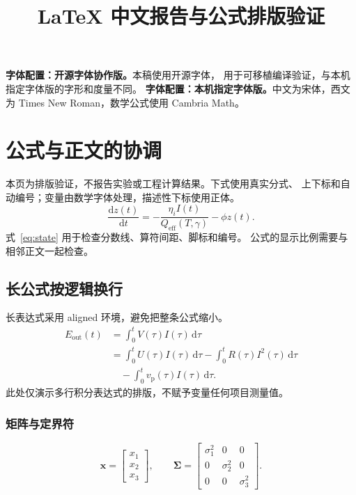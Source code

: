\documentclass[UTF8,fontset=none,zihao=5]{ctexart}
\title{\sffamily\bfseries LaTeX 中文报告与公式排版验证}
\author{}
\date{}
\begin{document}
\maketitle
\ifportablefonts
\noindent\textbf{字体配置：开源字体协作版。}本稿使用开源字体，
用于可移植编译验证，与本机指定字体版的字形和度量不同。
\else
\noindent\textbf{字体配置：本机指定字体版。}中文为宋体，西文为
Times New Roman，数学公式使用 Cambria Math。
\fi

\section{公式与正文的协调}
本页为排版验证，不报告实验或工程计算结果。下式使用真实分式、
上下标和自动编号；变量由数学字体处理，描述性下标使用正体。
\begin{equation}
 \frac{\mathrm{d}z(t)}{\mathrm{d}t}
 =-\frac{\eta_i I(t)}{Q_{\mathrm{eff}}(T,\gamma)}-\phi z(t).
 \label{eq:state}
\end{equation}
式~\eqref{eq:state} 用于检查分数线、算符间距、脚标和编号。
公式的显示比例需要与相邻正文一起检查。

\subsection{长公式按逻辑换行}
长表达式采用 aligned 环境，避免把整条公式缩小。
\begin{equation}
 \begin{aligned}
 E_{\mathrm{out}}(t)
 &=\int_0^t V(\tau)I(\tau)\,\mathrm{d}\tau\\
 &=\int_0^t U(\tau)I(\tau)\,\mathrm{d}\tau
   -\int_0^t R(\tau)I^2(\tau)\,\mathrm{d}\tau\\
 &\quad-\int_0^t v_{\mathrm{p}}(\tau)I(\tau)\,\mathrm{d}\tau .
 \end{aligned}
 \label{eq:integral}
\end{equation}
此处仅演示多行积分表达式的排版，不赋予变量任何项目测量值。

\subsubsection{矩阵与定界符}
\begin{equation}
 \boldsymbol{x}=
 \begin{bmatrix}x_1\\x_2\\x_3\end{bmatrix},
 \qquad
 \boldsymbol{\Sigma}=
 \begin{bmatrix}
 \sigma_1^2 & 0 & 0\\
 0 & \sigma_2^2 & 0\\
 0 & 0 & \sigma_3^2
 \end{bmatrix}.
\end{equation}
\end{document}
